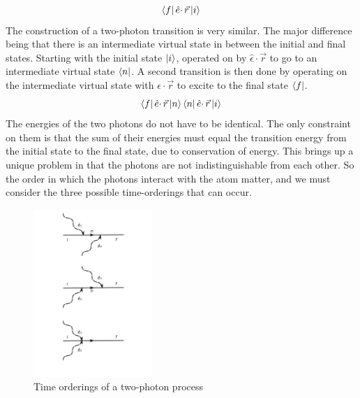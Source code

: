\begin{equation}
    \bra{f}\hat{e}\cdotp\Vec{r}\ket{i}
\end{equation}
The construction of a two-photon transition is very similar. The major difference being that there is an intermediate virtual state in between the initial and final states. Starting with the initial state $\ket{i}$, operated on by \(\hat{\epsilon}\cdotp\Vec{r}\) to go to an intermediate virtual state $\bra{n}$. A second transition is then done by operating on the intermediate virtual state with \(\hat{\epsilon}\cdotp\Vec{r}\) to excite to the final state $\bra{f}$.
\begin{equation}
        \bra{f}\hat{e}\cdotp\Vec{r}\ket{n}\bra{n}\hat{e}\cdotp\Vec{r}\ket{i}
\end{equation}
The energies of the two photons do not have to be identical. The only constraint on them is that the sum of their energies must equal the transition energy from the initial state to the final state, due to conservation of energy. This brings up a unique problem in that the photons are not indistinguishable from each other. So the order in which the photons interact with the atom matter, and we must consider the three possible time-orderings that can occur.
\begin{figure}
    \centering
    \caption{Time orderings of a two-photon process}
    \label{fig:Timeorder}
    \includegraphics[width=0.4\textwidth]{images/twopproc.png}
\end{figure}


